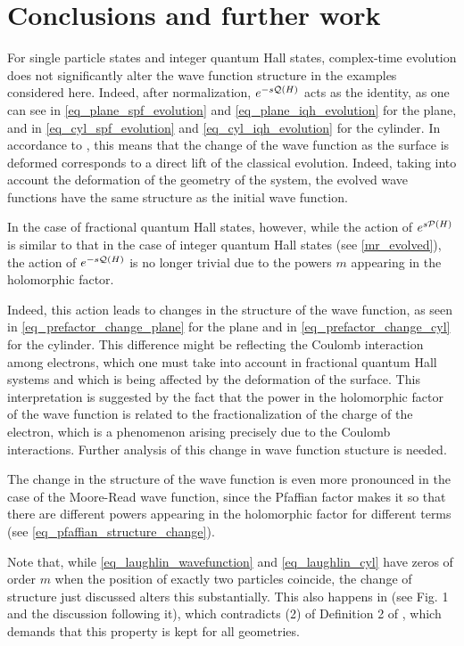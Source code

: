 \documentclass[notas.tex]{subfiles}
\begin{document}
\chapter{Conclusions and further work}\label{sec_conclusion}
For single particle states and integer quantum Hall states, complex-time evolution does not significantly alter the wave function structure in the examples considered here. Indeed, after normalization, $e^{-s\mathcal{Q}(H)}$ acts as the identity, as one can see in \eqref{eq_plane_spf_evolution} and \eqref{eq_plane_iqh_evolution} for the plane, and in \eqref{eq_cyl_spf_evolution} and \eqref{eq_cyl_iqh_evolution} for the cylinder. In accordance to , this means that the change of the wave function as the surface is deformed corresponds to a direct lift of the classical evolution. Indeed, taking into account the deformation of the geometry of the system, the evolved wave functions have the same structure as the initial wave function. 

In the case of fractional quantum Hall states, however, while the action of $e^{s\mathcal{P}(H)}$ is similar to that in the case of integer quantum Hall states (see \eqref{mr_evolved}), the action of $e^{-s\mathcal{Q}(H)}$ is no longer trivial due to the powers $m$ appearing in the holomorphic factor. 

Indeed, this action leads to changes in the structure of the wave function, as seen in \eqref{eq_prefactor_change_plane} for the plane and in \eqref{eq_prefactor_change_cyl} for the cylinder. This difference might be reflecting the Coulomb interaction among electrons, which one must take into account in fractional quantum Hall systems and which is being affected by the deformation of the surface. This interpretation is suggested by the fact that the power in the holomorphic factor of the wave function is related to the fractionalization of the charge of the electron, which is a phenomenon arising precisely due to the Coulomb interactions. Further analysis of this change in wave function stucture is needed. 

The change in the structure of the wave function is even more pronounced in the case of the Moore-Read wave function, since the Pfaffian factor makes it so that there are different powers appearing in
the holomorphic factor for different terms (see \eqref{eq_pfaffian_structure_change}).

Note that, while \eqref{eq_laughlin_wavefunction} and \eqref{eq_laughlin_cyl} have zeros of order $m$ when the position of exactly two particles coincide, the change of structure just discussed alters this substantially. This also happens in \cite{qiu_model_2012} (see Fig. 1 and the discussion following it), which contradicts (2) of Definition 2 of \cite{klevtsov_laughlin_2019}, which demands that this property is kept for all geometries. 
\end{document}
